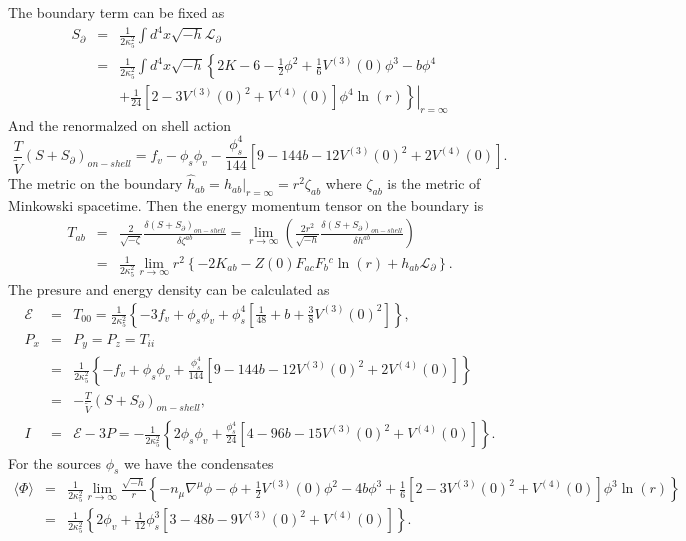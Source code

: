 \documentclass[a4paper,12pt]{article}
\numberwithin{equation}{section}
\begin{document}
The boundary term can be fixed as
\begin{eqnarray}
  S_{\partial}&=&\frac{1}{2\kappa_5^2}\int d^4x \sqrt{-h} \mathcal{L}_{\partial} \nonumber   \\
  &=&\frac{1}{2\kappa_5^2}\int d^4x \sqrt{-h}\left.\left\{2K-6-\frac{1}{2}\phi^2 +\frac{1}{6}V^{(3)}(0)\phi^3-b\phi^4\right.\right. \nonumber  \\
  && \left.\left.+\frac{1}{24}\left[ 2-3V^{(3)}(0)^2+V^{(4)}(0) \right]\phi^4\ln(r)
   \right\}\right|_{r=\infty} 
\end{eqnarray}
And the renormalzed on shell action
\begin{equation}
    \frac{T}{\tilde{V}}\left(S+S_{\partial}\right)_{on-shell}=f_v-\phi_s\phi_v-\frac{\phi_s^4}{144}\left[ 9-144b-12 V^{(3)}(0)^2+2V^{(4)}(0) \right].
\end{equation}
The metric on the boundary $\hat{h}_{ab}=\left. h_{ab}\right|_{r=\infty}=r^2  \zeta_{ab} $ where $\zeta_{ab}$ is the metric of Minkowski spacetime. Then the energy momentum tensor on the boundary is
\begin{eqnarray}
 T_{ab}&=&\frac{2}{\sqrt{-\zeta}}\frac{\delta \left(S+S_{\partial}\right)_{on-shell}}{\delta \zeta^{ab}}=\lim_{r\rightarrow\infty}\left(\frac{2r^2}{\sqrt{-h}}\frac{\delta \left(S+S_{\partial}\right)_{on-shell}}{\delta h^{ab}} \right) \nonumber  \\
 &=&\frac{1}{2\kappa_5^2}\lim_{r\rightarrow \infty} r^2\left\{ -2K_{ab}-Z(0)F_{ac}F_{b}{ }^{c}\ln(r) +h_{ab}\mathcal{L}_{\partial} \right\}.
\end{eqnarray}
The presure and energy density can be calculated as
\begin{eqnarray}
    \mathcal{E}&=&T_{00}=\frac{1}{2\kappa_5^2}\left\{-3f_v+\phi_s\phi_v+\phi_s^4\left[ \frac{1}{48}+b+\frac{3}{8}V^{(3)}(0)^2 \right]\right\},\\
    P_x&=&P_y=P_z=T_{ii} \nonumber \\
    &=&\frac{1}{2\kappa_5^2}\left\{-f_v+\phi_s\phi_v+\frac{\phi_s^4}{144}\left[ 9-144b-12 V^{(3)}(0)^2+2V^{(4)}(0)\right]\right\}\\
    &=&- \frac{T}{\tilde{V}}\left(S+S_{\partial}\right)_{on-shell} ,\nonumber \\
    I&=&\mathcal{E}-3P=-\frac{1}{2\kappa_5^2}\left\{2\phi_s\phi_v+\frac{\phi_s^4}{24}\left[ 4-96b-15 V^{(3)}(0)^2+V^{(4)}(0)\right]\right\}.
\end{eqnarray}
For the sources $\phi_s$ we have the condensates
\begin{eqnarray}
    \langle \Phi\rangle &=&\frac{1}{2\kappa_5^2} \lim_{r\rightarrow \infty}\frac{\sqrt{-h}}{r}\left\{- n_\mu\nabla^\mu\phi -\phi+\frac{1}{2}V^{(3)}(0)\phi^2-4b\phi^3+\frac{1}{6}\left[ 2-3 V^{(3)}(0)^2+V^{(4)}(0) \right]\phi^3\ln(r) \right\} \nonumber  \\
    &=&\frac{1}{2\kappa_5^2}\left\{ 2\phi_v+\frac{1}{12}\phi_s^3\left[3-48b-9V^{(3)}(0)^2+V^{(4)}(0)\right]\right\}.
\end{eqnarray}
\end{document}
